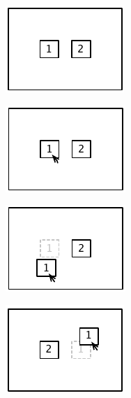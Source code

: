 \vspace{0.5cm}

\begin{figure}[hbt]
    \newcommand{\subfigurewidth}{0.28\textwidth}
    \newcommand{\graphicsscale}{1.2}
    \centering
    \begin{subfigure}{\subfigurewidth}
        \centering
        \includegraphics[scale=\graphicsscale]{resources/movement-action-example-a}
        \caption{}
        \label{fig:movement-action-example-a}
    \end{subfigure}
    \begin{subfigure}{\subfigurewidth}
        \centering
        \includegraphics[scale=\graphicsscale]{resources/movement-action-example-b}
        \caption{}
        \label{fig:movement-action-example-b}
    \end{subfigure}
    \begin{subfigure}{\subfigurewidth}
        \centering
        \includegraphics[scale=\graphicsscale]{resources/movement-action-example-c}
        \caption{}
        \label{fig:movement-action-example-c}
    \end{subfigure}
    \begin{subfigure}{\subfigurewidth}
        \centering
        \includegraphics[scale=\graphicsscale]{resources/movement-action-example-d}

\end{subfigure}
\end{figure}
